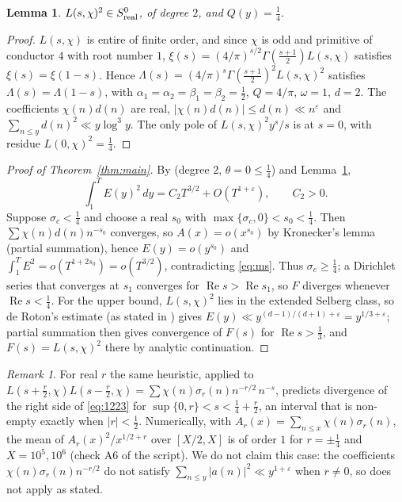 \documentclass[11pt]{article}
\newtheorem{lemma}[theorem]{Lemma}
\theoremstyle{remark}
\newtheorem{remark}[theorem]{Remark}
\begin{document}
\begin{lemma}\label{lem:class}
$L(s,\chi)^2\in S^0_{\rm real}$, of degree $2$, and $Q(y)=\tfrac14$.
\end{lemma}

\begin{proof}
$L(s,\chi)$ is entire of finite order, and since $\chi$ is odd and primitive of conductor $4$ with root number $1$,
$\xi(s)=(4/\pi)^{s/2}\Gamma(\tfrac{s+1}2)L(s,\chi)$ satisfies $\xi(s)=\xi(1-s)$. Hence $\Lambda(s)=(4/\pi)^s\Gamma(\tfrac{s+1}2)^2L(s,\chi)^2$
satisfies $\Lambda(s)=\Lambda(1-s)$, with $\alpha_1=\alpha_2=\beta_1=\beta_2=\tfrac12$, $Q=4/\pi$, $\omega=1$, $d=2$. The coefficients
$\chi(n)d(n)$ are real, $|\chi(n)d(n)|\le d(n)\ll n^\varepsilon$ and $\sum_{n\le y}d(n)^2\ll y\log^3y$. The only pole of $L(s,\chi)^2y^s/s$
is at $s=0$, with residue $L(0,\chi)^2=\tfrac14$.
\end{proof}

\begin{proof}[Proof of Theorem~\ref{thm:main}]
By \cite[Corollary~1]{CTZ} (degree $2$, $\theta=0\le\tfrac14$) and Lemma~\ref{lem:class},
\begin{equation}\label{eq:ms}
\int_1^TE(y)^2\,dy=C_2T^{3/2}+O(T^{1+\varepsilon}),\qquad C_2>0.
\end{equation}
Suppose $\sigma_c<\tfrac14$ and choose a real $s_0$ with $\max\{\sigma_c,0\}<s_0<\tfrac14$. Then $\sum\chi(n)d(n)n^{-s_0}$ converges,
so $A(x)=o(x^{s_0})$ by Kronecker's lemma (partial summation), hence $E(y)=o(y^{s_0})$ and $\int_1^TE^2=o(T^{1+2s_0})=o(T^{3/2})$,
contradicting \eqref{eq:ms}. Thus $\sigma_c\ge\tfrac14$; a Dirichlet series that converges at $s_1$ converges for
$\operatorname{Re}s>\operatorname{Re}s_1$, so $F$ diverges whenever $\operatorname{Re}s<\tfrac14$. For the upper bound, $L(s,\chi)^2$
lies in the extended Selberg class, so de Roton's estimate \cite{dR} (as stated in \cite[\S1.1]{CTZ}) gives $E(y)\ll y^{(d-1)/(d+1)+\varepsilon}=y^{1/3+\varepsilon}$;
partial summation then gives convergence of $F(s)$ for $\operatorname{Re}s>\tfrac13$, and $F(s)=L(s,\chi)^2$ there by analytic
continuation.
\end{proof}

\begin{remark}\label{rem:r}
For real $r$ the same heuristic, applied to $L(s+\tfrac r2,\chi)L(s-\tfrac r2,\chi)=\sum\chi(n)\sigma_r(n)n^{-r/2}\,n^{-s}$, predicts
divergence of the right side of \eqref{eq:1223} for $\sup\{0,r\}<s<\tfrac14+\tfrac r2$, an interval that is non-empty exactly when
$|r|<\tfrac12$. Numerically, with $A_r(x)=\sum_{n\le x}\chi(n)\sigma_r(n)$, the mean of $A_r(x)^2/x^{1/2+r}$ over $[X/2,X]$ is of order $1$ for
$r=\pm\tfrac14$ and $X=10^5,10^6$ (check A6 of the script). We do not claim this case: the coefficients $\chi(n)\sigma_r(n)n^{-r/2}$ do not satisfy
$\sum_{n\le y}|a(n)|^2\ll y^{1+\varepsilon}$ when $r\ne0$, so \cite[Corollary~1]{CTZ} does not apply as stated.
\end{remark}
\end{document}
